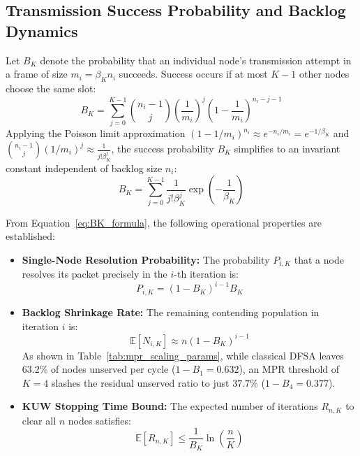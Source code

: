 \subsection{Transmission Success Probability and Backlog Dynamics}
Let $B_K$ denote the probability that an individual node's transmission attempt in a frame of size $m_i = \beta_K n_i$ succeeds. Success occurs if at most $K - 1$ other nodes choose the same slot:
\begin{equation}
    B_K = \sum_{j=0}^{K-1} \binom{n_i - 1}{j} \left( \frac{1}{m_i} \right)^j \left( 1 - \frac{1}{m_i} \right)^{n_i - j - 1}
\end{equation}
Applying the Poisson limit approximation $(1 - 1/m_i)^{n_i} \approx e^{-n_i / m_i} = e^{-1/\beta_K}$ and $\binom{n_i - 1}{j} (1/m_i)^j \approx \frac{1}{j! \beta_K^j}$, the success probability $B_K$ simplifies to an invariant constant independent of backlog size $n_i$:
\begin{equation}
    \label{eq:BK_formula}
    B_K = \sum_{j=0}^{K-1} \frac{1}{j! \beta_K^j} \exp\left( -\frac{1}{\beta_K} \right)
\end{equation}

From Equation~\eqref{eq:BK_formula}, the following operational properties are established:
\begin{itemize}
    \item \textbf{Single-Node Resolution Probability:} The probability $P_{i, K}$ that a node resolves its packet precisely in the $i$-th iteration is:
    \begin{equation}
        P_{i, K} = (1 - B_K)^{i - 1} B_K
    \end{equation}
    \item \textbf{Backlog Shrinkage Rate:} The remaining contending population in iteration $i$ is:
    \begin{equation}
        \mathbb{E}[N_{i, K}] \approx n (1 - B_K)^{i - 1}
    \end{equation}
    As shown in Table~\ref{tab:mpr_scaling_params}, while classical DFSA leaves $63.2\%$ of nodes unserved per cycle ($1 - B_1 = 0.632$), an MPR threshold of $K = 4$ slashes the residual unserved ratio to just $37.7\%$ ($1 - B_4 = 0.377$).
    \item \textbf{KUW Stopping Time Bound:} The expected number of iterations $R_{n, K}$ to clear all $n$ nodes satisfies:
    \begin{equation}
        \label{eq:RnK_kuw_bound}
        \mathbb{E}[R_{n, K}] \le \frac{1}{B_K} \ln\left( \frac{n}{K} \right)
    \end{equation}
\end{itemize}

